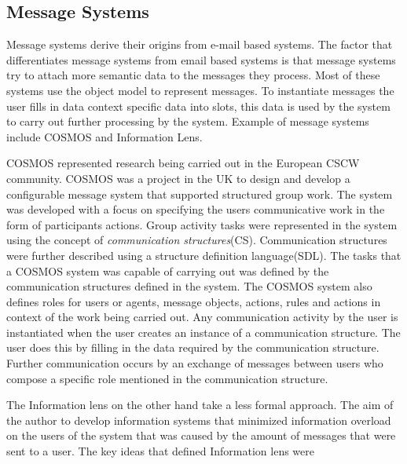 \subsection{Message Systems}

Message systems derive their origins from e-mail based systems. The
factor that differentiates message systems from email based systems is
that message systems try to attach more semantic data to the messages
they process. Most of these systems use the object model to represent
messages. To instantiate messages the user fills in data context
specific data into slots, this data is used by the system to carry out
further processing by the system. Example of message systems include
COSMOS\cite{conf/cscw/BowersC88} and Information Lens\cite{Malo87a}. 

COSMOS represented research being carried out in the European CSCW
community. COSMOS was a project in the UK to design and develop a
configurable message system that supported structured group work. The
system was developed with a focus on specifying the users
communicative work in the form of participants actions. Group activity
tasks were represented in the system using the concept of
\emph{communication
  structures}(CS)\cite{conf/cscw/BowersC88}. Communication structures
were further described using a structure definition language(SDL). The
tasks that a COSMOS system was capable of carrying out was defined by
the communication structures defined in the system. The COSMOS system
also defines roles for users or agents, message objects, actions,
rules and actions in context of the work being carried out. Any
communication activity by the user is instantiated when the user
creates an instance of a communication structure. The user does this
by filling in the data required by the communication
structure. Further communication occurs by an exchange of messages
between users who compose a specific role mentioned in the
communication structure.

The Information lens on the other hand take a less formal
approach\cite{journals/iwc/Rodden91}. The aim of the author to develop
information systems that minimized information overload on the users
of the system that was caused by the amount of messages that were sent
to a user. The key ideas that defined Information lens were


